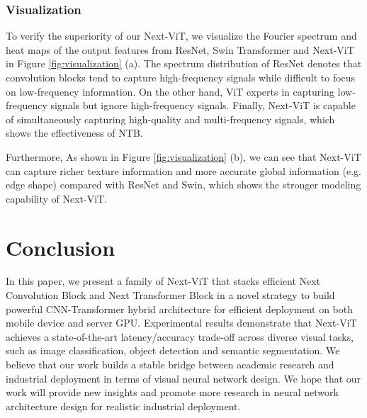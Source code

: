 \documentclass[10pt,twocolumn,letterpaper]{article}
\begin{document}
\subsubsection{Visualization}
 To verify the superiority of our Next-ViT, we visualize the Fourier spectrum and heat maps of the output features from ResNet, Swin Transformer and Next-ViT in Figure \ref{fig:visualization} (a). 
 The spectrum distribution of ResNet denotes that convolution blocks tend to capture high-frequency signals while difficult to focus on low-frequency information. On the other hand, ViT experts in capturing low-frequency signals but ignore high-frequency signals. Finally, Next-ViT is capable of simultaneously capturing high-quality and multi-frequency signals, which shows the effectiveness of NTB.
 
 Furthermore, As shown in Figure \ref{fig:visualization} (b), we can see that Next-ViT can capture richer texture information and more accurate global information (e.g. edge shape) compared with ResNet and Swin, which shows the stronger modeling capability of Next-ViT.
 


 
 
\section{Conclusion}
	\label{section:conclusion}
	In this paper, we present a family of Next-ViT that stacks efficient Next Convolution Block and Next Transformer Block in a novel strategy to build powerful CNN-Transformer hybrid architecture for efficient deployment on both mobile device and server GPU. 
	Experimental results demonstrate that Next-ViT achieves a state-of-the-art latency/accuracy trade-off across diverse visual tasks, such as image classification, object detection and semantic segmentation. We believe that our work builds a stable bridge between academic research and industrial deployment in terms of visual neural network design.
    We hope that our work will provide new insights and promote more research in neural network architecture design for realistic industrial deployment.




{\small


}
\end{document}

